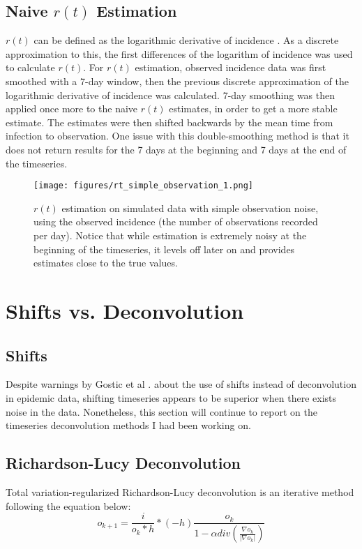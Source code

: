 \documentclass{article}
\begin{document}
\subsection{Naive $r(t)$ Estimation}
$r(t)$ can be defined as the logarithmic derivative of incidence \cite{Gostic}. As a discrete approximation to this, the first differences of the logarithm of incidence was used to calculate $r(t)$. For $r(t)$ estimation, observed incidence data was first smoothed with a 7-day window, then the previous discrete approximation of the logarithmic derivative of incidence was calculated. 7-day smoothing was then applied once more to the naive $r(t)$ estimates, in order to get a more stable estimate. The estimates were then shifted backwards by the mean time from infection to observation. One issue with this double-smoothing method is that it does not return results for the 7 days at the beginning and 7 days at the end of the timeseries.

\begin{figure}[h!]
    \centering
    \texttt{[image: figures/rt\_simple\_observation\_1.png]}
    \caption{$r(t)$ estimation on simulated data with simple observation noise, using the observed incidence (the number of observations recorded per day). Notice that while estimation is extremely noisy at the beginning of the timeseries, it levels off later on and provides estimates close to the true values.}
\end{figure}


\section{Shifts vs. Deconvolution}

\subsection{Shifts}
Despite warnings by Gostic et al \cite{Gostic}. about the use of shifts instead of deconvolution in epidemic data, shifting timeseries appears to be superior when there exists noise in the data. Nonetheless, this section will continue to report on the timeseries deconvolution methods I had been working on.


\subsection{Richardson-Lucy Deconvolution}
Total variation-regularized Richardson-Lucy deconvolution is an iterative method following the equation below: \cite{RLLoss}
\begin{equation}
    o_{k+1} = \frac{i}{o_k * h} * (-h) \frac{o_k}{1-\alpha div(\frac{\nabla o_k}{|\nabla o_k|})}
\end{equation}
\end{document}
